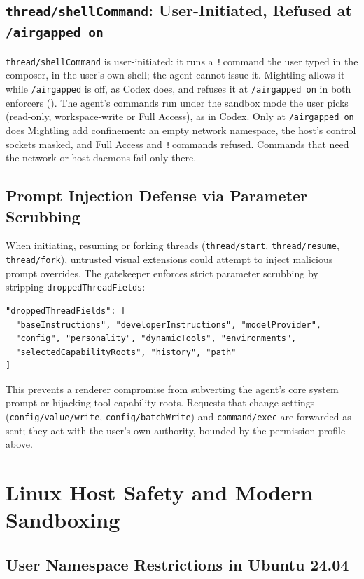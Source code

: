 \documentclass[11pt]{article}
\newcommand{\code}[1]{\texttt{#1}}
\newcommand{\agon}{\code{/airgapped on}}
\begin{document}
\subsection{\code{thread/shellCommand}: User-Initiated, Refused at \agon}

\code{thread/shellCommand} is user-initiated: it runs a \code{!}\,command the user typed in the composer, in the
user's own shell; the agent cannot issue it. Mightling allows it while \code{/airgapped} is off, as Codex does, and
refuses it at \agon{} in both enforcers (). The agent's commands run under the sandbox
mode the user picks (read-only, workspace-write or Full Access), as in Codex. Only at \agon{} does Mightling add
confinement: an empty network namespace, the host's control sockets masked, and Full Access and \code{!}\,commands
refused. Commands that need the network or host daemons fail only there.

\subsection{Prompt Injection Defense via Parameter Scrubbing}

When initiating, resuming or forking threads (\code{thread/start}, \code{thread/resume}, \code{thread/fork}), untrusted
visual extensions could attempt to inject malicious prompt overrides. The gatekeeper enforces strict parameter
scrubbing by stripping \code{droppedThreadFields}:
\begin{lstlisting}
"droppedThreadFields": [
  "baseInstructions", "developerInstructions", "modelProvider",
  "config", "personality", "dynamicTools", "environments",
  "selectedCapabilityRoots", "history", "path"
]
\end{lstlisting}
This prevents a renderer compromise from subverting the agent's core system prompt or hijacking tool capability roots.
Requests that change settings (\code{config/value/write}, \code{config/batchWrite}) and \code{command/exec} are
forwarded as sent; they act with the user's own authority, bounded by the permission profile above.

\section{Linux Host Safety and Modern Sandboxing}
\label{sec:sandboxing}

\subsection{User Namespace Restrictions in Ubuntu 24.04}
\end{document}
